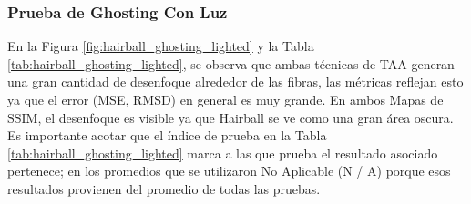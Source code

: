 \documentclass[pregrado]{tesis-usb} %
\begin{document}
\subsubsection{Prueba de Ghosting Con Luz}
En la Figura \ref{fig:hairball_ghosting_lighted} y la Tabla \ref{tab:hairball_ghosting_lighted}, se observa que ambas técnicas de TAA generan una gran cantidad de desenfoque alrededor de las fibras, las métricas reflejan esto ya que el error (MSE, RMSD) en general es muy grande. En ambos Mapas de SSIM, el desenfoque es visible ya que Hairball se ve como una gran área oscura. Es importante acotar que el índice de prueba en la Tabla \ref{tab:hairball_ghosting_lighted} marca a las que prueba el resultado asociado pertenece; en los promedios que se utilizaron No Aplicable (N / A) porque esos resultados provienen del promedio de todas las pruebas.
\end{document}
